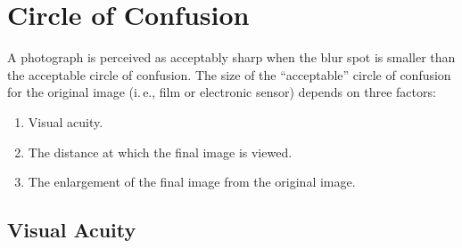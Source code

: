 \documentclass[11pt, oneside]{scrartcl}   	%
\begin{document}
\section{Circle of Confusion}

A photograph is perceived as acceptably sharp when the blur spot is smaller than the acceptable circle of confusion. The size of the “acceptable” circle of confusion for the original image (i.\,e., film or electronic sensor) depends on three factors:
\begin{enumerate}
\item Visual acuity.
\item The distance at which the final image is viewed.
\item The enlargement of the final image from the original image.

\end{enumerate}

\subsection{Visual Acuity}
\end{document}

